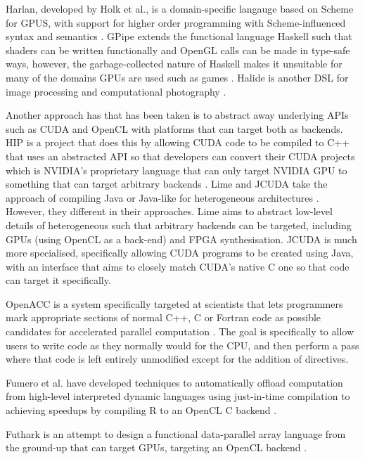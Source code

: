 \documentclass[a4paper,12pt,twoside,openright]{report}
\begin{document}
Harlan, developed by Holk et al., is a domain-specific langauge based on Scheme
for GPUS, with support for higher order programming with Scheme-influenced
syntax and semantics \cite{Harlan} \cite{HarlanAnnouncement}. GPipe extends the
functional language Haskell such that shaders can be written functionally and
OpenGL calls can be made in type-safe ways, however, the garbage-collected
nature of Haskell makes it unsuitable for many of the domains GPUs are used
such as games \cite{HaskellState} \cite{GPipe}. Halide is another DSL for image
processing and computational photography \cite{Halide}.

Another approach has that has been taken is to abstract away underlying APIs
such as CUDA and OpenCL with platforms that can target both as backends. HIP is
a project that does this by allowing CUDA code to be compiled to C++ that uses
an abstracted API so that developers can convert their CUDA projects which is
NVIDIA's proprietary language that can only target NVIDIA GPU to something that
can target arbitrary backends \cite{HIP}. Lime and JCUDA take the approach of
compiling Java or Java-like for heterogeneous architectures \cite{Lime2010}
\cite{Lime2012} \cite{JCUDA2009}. However, they different in their approaches.
Lime aims to abstract low-level details of heterogeneous such that arbitrary
backends can be targeted, including GPUs (using OpenCL as a back-end) and FPGA
synthesisation. JCUDA is much more specialised, specifically allowing CUDA
programs to be created using Java, with an interface that aims to closely match
CUDA's native C one so that code can target it specifically.

OpenACC is a system specifically targeted at scientists that lets programmers
mark appropriate sections of normal C++, C or Fortran code as possible
candidates for accelerated parallel computation \cite{OpenACC}. The goal is
specifically to allow users to write code as they normally would for the CPU,
and then perform a pass where that code is left entirely unmodified except for
the addition of directives.

Fumero et al. have developed techniques to automatically offload computation
from high-level interpreted dynamic languages using just-in-time compilation to
achieving speedups by compiling R to an OpenCL C backend \cite{JITGPU}.

Futhark is an attempt to design a functional data-parallel array language from
the ground-up that can target GPUs, targeting an OpenCL backend
\cite{Futhark}.
\end{document}
